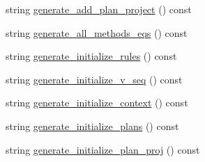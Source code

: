\begin{CompactItemize}
\item 
string \hyperlink{classgenevalmag_1_1Builder__code_16c49d69826f56e892f3580cdc7fa610}{generate\_\-add\_\-plan\_\-project} () const 
\item 
string \hyperlink{classgenevalmag_1_1Builder__code_a13031885f7de51469cc9e1ea5a4b9e6}{generate\_\-all\_\-methods\_\-eqs} () const 
\item 
string \hyperlink{classgenevalmag_1_1Builder__code_5b244721c0c026570512c5e92acf3c7c}{generate\_\-initialize\_\-rules} () const 
\item 
string \hyperlink{classgenevalmag_1_1Builder__code_a22bd086103a19a4d6dade0cab84b62d}{generate\_\-initialize\_\-v\_\-seq} () const 
\item 
string \hyperlink{classgenevalmag_1_1Builder__code_eb44411cbae61fe53b734486945ab7f4}{generate\_\-initialize\_\-context} () const 
\item 
string \hyperlink{classgenevalmag_1_1Builder__code_4ff44b4aeb0d64f987f58754b997dbef}{generate\_\-initialize\_\-plans} () const 
\item 
string \hyperlink{classgenevalmag_1_1Builder__code_76c0b81220998ec7e604184fab7a15fe}{generate\_\-initialize\_\-plan\_\-proj} () const 
\end{CompactItemize}
